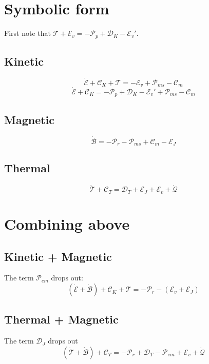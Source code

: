 \documentclass[11pt]{article}
\newcommand{\MC}{\mathcal}
\begin{document}
\section{Symbolic form}
First note that $\MC T + \MC E_v = -\MC P_p + \MC D_K - \MC E_v'$.
\subsection{Kinetic}
\begin{equation}
	\dot{\MC E} + \MC C_K + \MC T = - \MC E_v + \MC P_{ms} - \MC C_m
\end{equation}
\begin{equation}
	\dot{\MC E} + \MC C_K = -\MC P_p + \MC D_K - \MC E_v' + \MC P_{ms} - \MC C_m
\end{equation}
\subsection{Magnetic}
\begin{equation}
	\dot{\MC B} = -\MC P_r - \MC P_{ms} + \MC C_m - \MC E_J
\end{equation}
\subsection{Thermal}
\begin{equation}
	\dot{\MC T} + \MC C_T = \MC D_T + \MC E_J + \MC E_v + \dot{\MC Q}
\end{equation}

\section{Combining above}
\subsection{Kinetic + Magnetic}
The term $\MC P_{em}$ drops out:
\begin{equation}
	(\dot{\MC E} + \dot{\MC B}) + \MC C_K + \MC T = -\MC P_r - (\MC E_v + \MC E_J)
\end{equation}

\subsection{Thermal + Magnetic}
The term $\MC D_J$ drops out
\begin{equation}
	(\dot{\MC T}+\dot{\MC B}) + \MC C_T = -\MC P_r + \MC D_T - \MC P_{em} + \MC E_v + \dot{\MC Q}
\end{equation}
\end{document}
